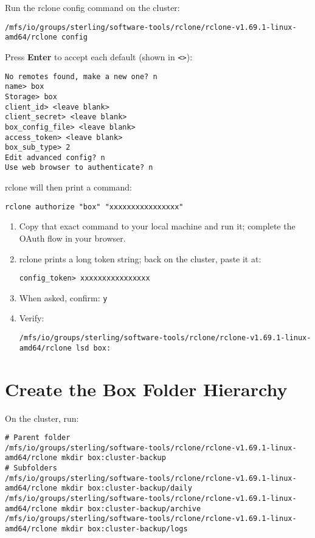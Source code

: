 \documentclass[12pt,letterpaper]{article}
\begin{document}
Run the rclone config command on the cluster:
\begin{lstlisting}[style=custombash]
/mfs/io/groups/sterling/software-tools/rclone/rclone-v1.69.1-linux-amd64/rclone config
\end{lstlisting}

Press \textbf{Enter} to accept each default (shown in \texttt{<>}):
\begin{lstlisting}[style=custombash]
No remotes found, make a new one? n
name> box
Storage> box
client_id> <leave blank>
client_secret> <leave blank>
box_config_file> <leave blank>
access_token> <leave blank>
box_sub_type> 2
Edit advanced config? n
Use web browser to authenticate? n
\end{lstlisting}

rclone will then print a command:
\begin{lstlisting}[style=custombash]
rclone authorize "box" "xxxxxxxxxxxxxxxx"
\end{lstlisting}

\begin{enumerate}
  \item Copy that exact command to your local machine and run it; complete the OAuth flow in your browser.
  \item rclone prints a long token string; back on the cluster, paste it at:
    \begin{lstlisting}[style=custombash]
config_token> xxxxxxxxxxxxxxxx
    \end{lstlisting}
  \item When asked, confirm: \texttt{y}
  \item Verify:
    \begin{lstlisting}[style=custombash]
/mfs/io/groups/sterling/software-tools/rclone/rclone-v1.69.1-linux-amd64/rclone lsd box:
    \end{lstlisting}
\end{enumerate}

\section{Create the Box Folder Hierarchy}

On the cluster, run:
\begin{lstlisting}[style=custombash]
# Parent folder
/mfs/io/groups/sterling/software-tools/rclone/rclone-v1.69.1-linux-amd64/rclone mkdir box:cluster-backup
# Subfolders
/mfs/io/groups/sterling/software-tools/rclone/rclone-v1.69.1-linux-amd64/rclone mkdir box:cluster-backup/daily
/mfs/io/groups/sterling/software-tools/rclone/rclone-v1.69.1-linux-amd64/rclone mkdir box:cluster-backup/archive
/mfs/io/groups/sterling/software-tools/rclone/rclone-v1.69.1-linux-amd64/rclone mkdir box:cluster-backup/logs
\end{lstlisting}
\end{document}
